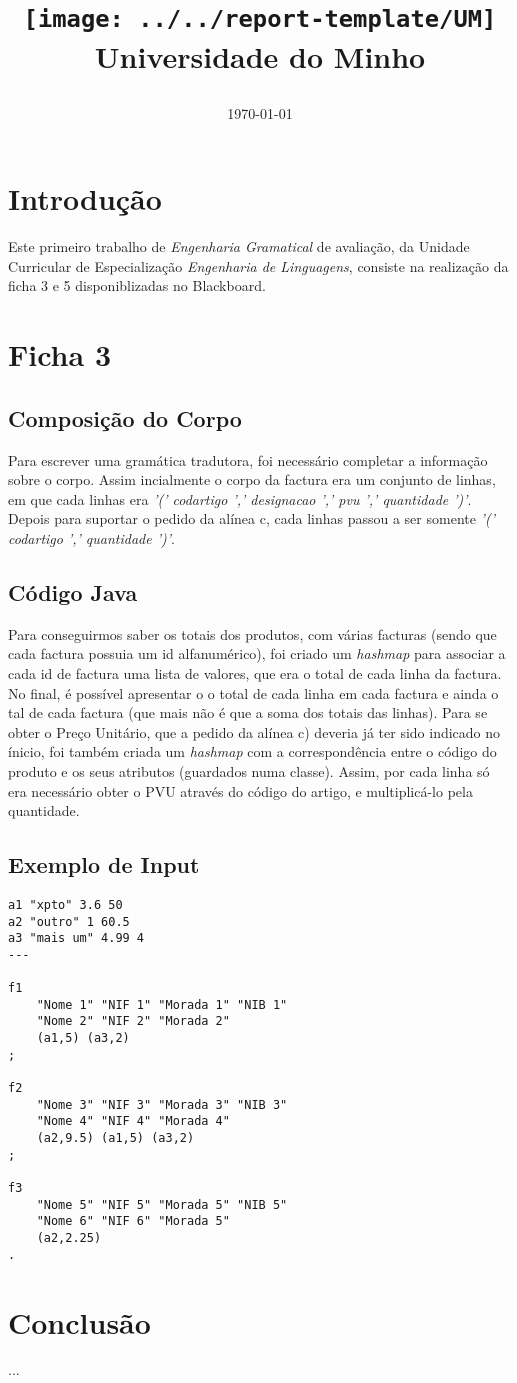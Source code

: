 \documentclass[a4paper,11pt,openright,openbib]{article}
\title{
	\large{\texttt{[image: ../../report-template/UM]}} \\
	\large{Universidade do Minho} \\
	\date{\today}
}
\begin{document}
\maketitle


\pagestyle{headings}
\newpage
\tableofcontents
\newpage
\section{Introdução}
Este primeiro trabalho de \emph{Engenharia Gramatical} de avaliação, da Unidade Curricular de Especialização 
\emph{Engenharia de Linguagens}, consiste na realização da ficha 3 e 5 disponiblizadas no Blackboard.
\section{Ficha 3}
\subsection{Composição do Corpo}
Para escrever uma gramática tradutora, foi necessário completar a informação sobre o corpo. Assim incialmente o corpo da
factura era um conjunto de linhas, em que cada linhas era \emph{'(' codartigo ',' designacao ',' pvu ',' quantidade ')'}.
Depois para suportar o pedido da alínea c, cada linhas passou a ser somente \emph{'(' codartigo ',' quantidade ')'}.
\subsection{Código Java}
Para conseguirmos saber os totais dos produtos, com várias facturas (sendo que cada factura possuia um id alfanumérico),
foi criado um \emph{hashmap} para associar a cada id de factura uma lista de valores, que era o total de cada linha
da factura. No final, é possível apresentar o o total de cada linha em cada factura e ainda o tal de cada factura (que 
mais não é que a soma dos totais das linhas).
Para se obter o Preço Unitário, que a pedido da alínea c) deveria já ter sido indicado no ínicio, foi também criada um
\emph{hashmap} com a correspondência entre o código do produto e os seus atributos (guardados numa classe). Assim, por
cada linha só era necessário obter o PVU através do código do artigo, e multiplicá-lo pela quantidade.
\subsection{Exemplo de Input}
\begin{verbatim}
a1 "xpto" 3.6 50
a2 "outro" 1 60.5
a3 "mais um" 4.99 4
---

f1
	"Nome 1" "NIF 1" "Morada 1" "NIB 1"
	"Nome 2" "NIF 2" "Morada 2"
	(a1,5) (a3,2)
;

f2
	"Nome 3" "NIF 3" "Morada 3" "NIB 3"
	"Nome 4" "NIF 4" "Morada 4"
	(a2,9.5) (a1,5) (a3,2)
;

f3
	"Nome 5" "NIF 5" "Morada 5" "NIB 5"
	"Nome 6" "NIF 6" "Morada 5"
	(a2,2.25)
.
\end{verbatim}
\section{Conclusão}
... %
\end{document}
